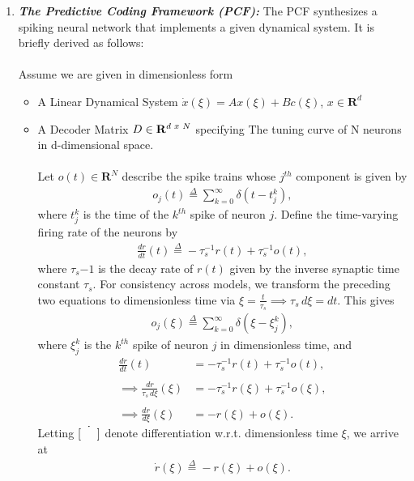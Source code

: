 \begin{enumerate}

\item \textbf{\textit{The Predictive Coding Framework (PCF):}} The PCF synthesizes a spiking neural network that implements a given dynamical system. It is briefly derived as follows:\\
\\
Assume we are given in dimensionless form
\begin{itemize}
    \item A Linear Dynamical System  $\dot{x}(\xi) = A x(\xi) + B c(\xi)$,  $x \in \mathbf{R}^d$
    
    \item A Decoder Matrix $D \in \mathbf{R}^{d\hspace{1mm} x \hspace{1mm}N}$ specifying The tuning curve of N neurons in d-dimensional space. \\
\\   
Let $o(t) \in \mathbf{R}^{N}$ describe the spike trains whose $j^{th}$ component is given by
\begin{align*}
	o_j(t) \overset{\Delta}{=} \sum_{k=0}^{\infty} \delta(t - t_j^k),
\end{align*} 
where $t_j^k$ is the time of the $k^{th}$ spike of neuron $j$. 
Define the time-varying firing rate of the neurons by 
\begin{align*}
	\frac{d r}{d t}(t) \overset{\Delta}{=} - \tau_s^{-1} r(t) + \tau_s^{-1} o(t),
\end{align*}
where $\tau_s{-1}$ is the decay rate of $r(t)$ given by the inverse synaptic time constant $\tau_s$. For consistency across models, we transform the preceding two equations to dimensionless time via $\xi = \frac{t}{\tau_s} \implies  \tau_s \, d \xi = dt$. This gives
\begin{align}
	\label{eq:analysis:comparison_sc_vs_pcf_vs_gj:pcf_o_def}
	o_j(\xi) \overset{\Delta}{=} \sum_{k=0}^{\infty} \delta(\xi - \xi_j^k),
\end{align}
where $\xi_j^k$ is the $k^{th}$ spike of neuron $j$ in dimensionless time, and
\begin{align*}
	\frac{d r}{d t}(t) &= - \tau_s^{-1} r(t) + \tau_s^{-1}o(t),
	\\
	\\
	\implies
	\frac{d r}{\tau_s \, d \xi}(\xi) &= - \tau_s^{-1} r(\xi) + \tau_s^{-1} o(\xi),
	\\
	\\
	\implies
	\frac{dr}{d\xi}(\xi) &= - r(\xi) + o(\xi).
\end{align*}    
Letting $\dot{\left[ \hspace{5mm} \right]}$ denote differentiation w.r.t. dimensionless time $\xi$, we arrive at 
\begin{align}
\label{eq:analysis:comparison_sc_vs_pcf_vs_gj:pcf_r_def}
\dot{r}(\xi) \overset{\Delta}{=} - r(\xi) + o(\xi). 
\end{align}


\end{itemize}
\end{enumerate}
